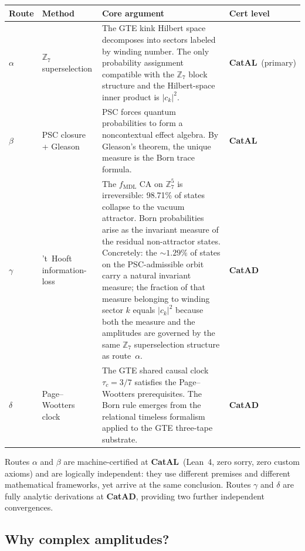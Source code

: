 \documentclass[11pt,a4paper]{article}
\newcommand{\MDL}{\mathrm{MDL}}
\newcommand{\CatAL}{\textbf{CatAL}}
\newcommand{\CatAD}{\textbf{CatAD}}
\begin{document}
\bigskip
\begin{center}
\begin{tabular}{p{1.2cm}p{3.5cm}p{4.5cm}p{2.5cm}}
\toprule
\textbf{Route} & \textbf{Method} & \textbf{Core argument} & \textbf{Cert level} \\
\midrule
$\alpha$ & $\mathbb{Z}_7$ superselection & The GTE kink Hilbert space decomposes
  into sectors labeled by winding number. The only probability assignment compatible
  with the $\mathbb{Z}_7$ block structure and the Hilbert-space inner product
  is $|c_k|^2$.
  & \CatAL\ (primary) \\[12pt]
$\beta$ & PSC closure + Gleason & PSC forces quantum probabilities to form a
  noncontextual effect algebra.  By Gleason's theorem, the unique measure is
  the Born trace formula.
  & \CatAL \\[12pt]
$\gamma$ & 't~Hooft information-loss & The $f_{\MDL}$ CA on $\mathbb{Z}_7^5$ is
  irreversible: 98.71\% of states collapse to the vacuum attractor.  Born probabilities
  arise as the invariant measure of the residual non-attractor states.  Concretely:
  the $\sim\!1.29\%$ of states on the PSC-admissible orbit carry a natural invariant
  measure; the fraction of that measure belonging to winding sector $k$ equals
  $|c_k|^2$ because both the measure and the amplitudes are governed by the same
  $\mathbb{Z}_7$ superselection structure as route~$\alpha$.
  & \CatAD \\[12pt]
$\delta$ & Page--Wootters clock & The GTE shared causal clock $\tau_c = 3/7$ satisfies
  the Page--Wootters prerequisites.  The Born rule emerges from the relational
  timeless formalism applied to the GTE three-tape substrate.
  & \CatAD \\
\bottomrule
\end{tabular}
\end{center}

\bigskip
\noindent
Routes $\alpha$ and $\beta$ are machine-certified at \CatAL\ (Lean~4, zero sorry,
zero custom axioms) and are logically independent: they use different premises and
different mathematical frameworks, yet arrive at the same conclusion.
Routes $\gamma$ and $\delta$ are fully analytic derivations at \CatAD, providing
two further independent convergences.

\subsection{Why complex amplitudes?}
\end{document}
